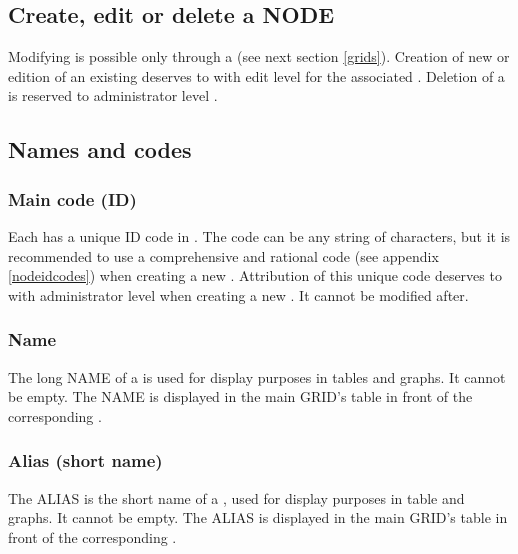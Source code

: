 

\subsection{Create, edit or delete a NODE}

Modifying  is possible only through a  (see next section \ref{grids}). Creation of new  or edition of an existing  deserves to  with edit level for the associated . Deletion of a  is reserved to administrator level .


\subsection{Names and codes}

\subsubsection{Main code (ID)}

Each  has a unique ID code in \webobs. The code can be any string of characters, but it is recommended to use a comprehensive and rational code (see appendix \ref{nodeidcodes}) when creating a new . Attribution of this unique code deserves to  with administrator level when creating a new . It cannot be modified after.

\subsubsection{Name}

The long NAME of a  is used for display purposes in tables and graphs. It cannot be empty. The NAME is displayed in the main GRID's table in front of the corresponding .


\subsubsection{Alias (short name)}

The ALIAS is the short name of a , used for display purposes in table and graphs. It cannot be empty. The ALIAS is displayed in the main GRID's table in front of the corresponding .



